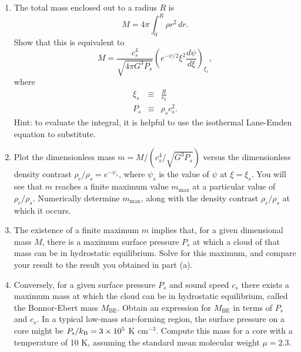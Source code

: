 \begin{enumerate}
\begin{enumerate}
\item The total mass enclosed out to a radius $R$ is
\begin{displaymath}
M = 4\pi \int_0^R \rho r^2 \, dr.
\end{displaymath}
Show that this is equivalent to
\begin{displaymath}
M =\frac{c_s^4}{\sqrt{4\pi G^3 P_s}} \left(e^{-\psi/2}\xi^2 \frac{d\psi}{d\xi}\right)_{\xi_s},
\end{displaymath}
where
\begin{eqnarray*}
\xi_s & \equiv & \frac{R}{r_0} \\
P_s & \equiv & \rho_s c_s^2.
\end{eqnarray*}
Hint: to evaluate the integral, it is helpful to use the isothermal Lane-Emden equation to substitute.
\item Plot the dimensionless mass $m = M/(c_s^4/\sqrt{G^3 P_s})$ versus the dimensionless density contrast $\rho_c/\rho_s=e^{-\psi_s}$, where $\psi_s$ is the value of $\psi$ at $\xi=\xi_s$. You will see that $m$ reaches a finite maximum value $m_{\mathrm{max}}$ at a particular value of $\rho_c/\rho_s$. Numerically determine $m_{\mathrm{max}}$, along with the density contrast $\rho_c/\rho_s$ at which it occurs.
\item The existence of a finite maximum $m$ implies that, for a given dimensional mass $M$, there is a maximum surface pressure $P_s$ at which a cloud of that mass can be in hydrostatic equilibrium. Solve for this maximum, and compare your result to the result you obtained in part (a).
\item Conversely, for a given surface pressure $P_s$ and sound speed $c_s$ there exists a maximum mass at which the cloud can be in hydrostatic equilibrium, called the Bonnor-Ebert mass $M_{\mathrm{BE}}$. Obtain an expression for $M_{\mathrm{BE}}$ in terms of $P_s$ and $c_s$. In a typical low-mass star-forming region, the surface pressure on a core might be $P_{\mathrm{s}}/k_{\rm B} = 3\times 10^5$ K cm$^{-3}$. Compute this mass for a core with a temperature of 10 K, assuming the standard mean molecular weight $\mu=2.3$.\\
\end{enumerate}


\end{enumerate}
